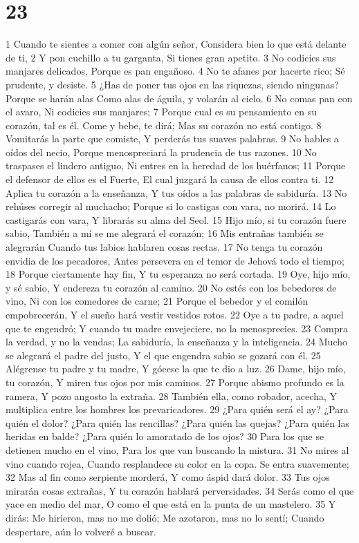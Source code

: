 \chapter{23}

1 Cuando te sientes a comer con algún señor,
Considera bien lo que está delante de ti,
2 Y pon cuchillo a tu garganta,
Si tienes gran apetito.
3 No codicies sus manjares delicados,
Porque es pan engañoso.
4 No te afanes por hacerte rico;
Sé prudente, y desiste.
5 ¿Has de poner tus ojos en las riquezas, siendo ningunas?
Porque se harán alas
Como alas de águila, y volarán al cielo.
6 No comas pan con el avaro,
Ni codicies sus manjares;
7 Porque cual es su pensamiento en su corazón, tal es él.
Come y bebe, te dirá;
Mas su corazón no está contigo.
8 Vomitarás la parte que comiste,
Y perderás tus suaves palabras.
9 No hables a oídos del necio,
Porque menospreciará la prudencia de tus razones.
10 No traspases el lindero antiguo,
Ni entres en la heredad de los huérfanos;
11 Porque el defensor de ellos es el Fuerte,
El cual juzgará la causa de ellos contra ti.
12 Aplica tu corazón a la enseñanza,
Y tus oídos a las palabras de sabiduría.
13 No rehúses corregir al muchacho;
Porque si lo castigas con vara, no morirá.
14 Lo castigarás con vara,
Y librarás su alma del Seol.
15 Hijo mío, si tu corazón fuere sabio,
También a mí se me alegrará el corazón;
16 Mis entrañas también se alegrarán 
Cuando tus labios hablaren cosas rectas.
17 No tenga tu corazón envidia de los pecadores,
Antes persevera en el temor de Jehová todo el tiempo;
18 Porque ciertamente hay fin,
Y tu esperanza no será cortada.
19 Oye, hijo mío, y sé sabio,
Y endereza tu corazón al camino.
20 No estés con los bebedores de vino,
Ni con los comedores de carne;
21 Porque el bebedor y el comilón empobrecerán,
Y el sueño hará vestir vestidos rotos.
22 Oye a tu padre, a aquel que te engendró;
Y cuando tu madre envejeciere, no la menosprecies.
23 Compra la verdad, y no la vendas;
La sabiduría, la enseñanza y la inteligencia.
24 Mucho se alegrará el padre del justo,
Y el que engendra sabio se gozará con él.
25 Alégrense tu padre y tu madre,
Y gócese la que te dio a luz.
26 Dame, hijo mío, tu corazón,
Y miren tus ojos por mis caminos.
27 Porque abismo profundo es la ramera,
Y pozo angosto la extraña.
28 También ella, como robador, acecha,
Y multiplica entre los hombres los prevaricadores.
29 ¿Para quién será el ay? ¿Para quién el dolor? ¿Para quién las rencillas?
¿Para quién las quejas? ¿Para quién las heridas en balde?
¿Para quién lo amoratado de los ojos?
30 Para los que se detienen mucho en el vino,
Para los que van buscando la mistura.
31 No mires al vino cuando rojea,
Cuando resplandece su color en la copa.
Se entra suavemente;
32 Mas al fin como serpiente morderá,
Y como áspid dará dolor.
33 Tus ojos mirarán cosas extrañas,
Y tu corazón hablará perversidades.
34 Serás como el que yace en medio del mar,
O como el que está en la punta de un mastelero.
35 Y dirás: Me hirieron, mas no me dolió;
Me azotaron, mas no lo sentí;
Cuando despertare, aún lo volveré a buscar.

